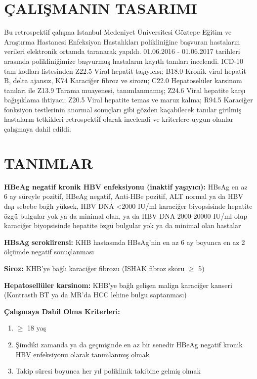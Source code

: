 
\section {ÇALIŞMANIN TASARIMI} Bu retrospektif çalışma Istanbul Medeniyet Üniversitesi Göztepe Eğitim ve Araştırma Hastanesi Enfeksiyon Hastalıkları polikliniğine başvuran hastaların verileri elektronik ortamda taranarak yapıldı. 01.06.2016 - 01.06.2017 tarihleri arasında polikliniğimize başvurmuş hastaların kayıtlı tanıları incelendi. ICD-10 tanı kodları listesinden Z22.5 Viral hepatit taşıyıcısı; B18.0 Kronik viral hepatit B, delta ajansız, K74 Karaciğer fibroz ve sirozu; C22.0 Hepatoselüler karsinom tanıları ile Z13.9 Tarama muayenesi, tanımlanmamış; Z24.6 Viral hepatite karşı bağışıklama ihtiyacı; Z20.5 Viral hepatite temas ve maruz kalma; R94.5 Karaciğer fonksiyon testlerinin anormal sonuçları gibi gözden kaçabilecek tanılar girilmiş hastaların tetkikleri retrospektif olarak incelendi ve kriterlere uygun olanlar çalışmaya dahil edildi. 

\section{TANIMLAR} 

\textbf{HBeAg negatif kronik HBV enfeksiyonu (inaktif yaşıyıcı): } HBsAg en az 6 ay süreyle pozitif, HBeAg negatif, Anti-HBe pozitif, ALT normal ya da HBV dışı sebebe bağlı yüksek, HBV DNA <2000 IU/ml karaciğer biyopsisinde hepatite özgü bulgular yok ya da minimal olan, ya da HBV DNA 2000-20000 IU/ml olup karaciğer biyopsisinde hepatite özgü bulgular yok ya da minimal olan hastalar

\textbf{HBsAg seroklirensi: } KHB hastasında HBsAg'nin en az 6 ay boyunca en az 2 ölçümde negatif sonuçlanması

\textbf{Siroz:} KHB'ye bağlı karaciğer fibrozu (ISHAK fibroz skoru $ \geq $ 5)

\textbf{Hepatosellüler karsinom:} KHB'ye bağlı gelişen malign karaciğer kanseri (Kontrastlı BT ya da MR'da HCC lehine bulgu saptanması)

\newpage

\textbf{Çalışmaya Dahil Olma Kriterleri:}

\begin{enumerate}
\item $ \geq $ 18 yaş
\item Şimdiki zamanda ya da geçmişinde en az bir senedir HBeAg negatif kronik HBV enfeksiyonu olarak tanımlanmış olmak
\item Takip süresi boyunca her yıl poliklinik takibine gelmiş olmak
\end{enumerate}

